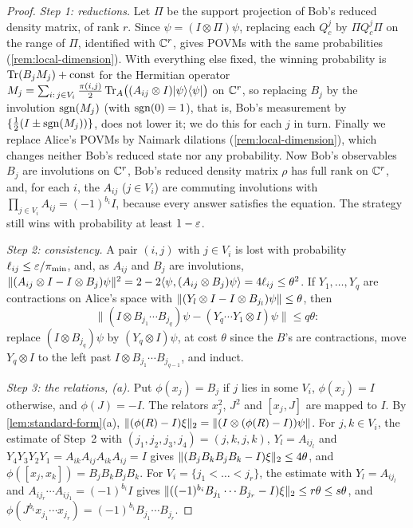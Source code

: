 \begin{proof}
\emph{Step 1: reductions.} Let $\Pi$ be the support projection of Bob's reduced density matrix, of rank $r$. Since $\psi=(I\otimes\Pi)\psi$,
replacing each $Q^j_c$ by $\Pi Q^j_c\Pi$ on the range of $\Pi$, identified with $\mathbb C^r$, gives POVMs with the same probabilities
(\cref{rem:local-dimension}). With everything else fixed, the winning probability is $\operatorname{Tr}(B_jM_j)+\mathrm{const}$ for the Hermitian operator
$M_j=\sum_{i:\,j\in V_i}\frac{\pi(i,j)}2\operatorname{Tr}_A\bigl((A_{ij}\otimes I)|\psi\rangle\langle\psi|\bigr)$ on $\mathbb C^r$, so replacing $B_j$ by the
involution $\operatorname{sgn}(M_j)$ (with $\operatorname{sgn}(0)=1$), that is, Bob's measurement by $\{\frac12(I\pm\operatorname{sgn}(M_j))\}$, does not lower it; we do this for each
$j$ in turn. Finally we replace Alice's POVMs by Naimark dilations (\cref{rem:local-dimension}), which changes neither Bob's reduced state
nor any probability. Now Bob's observables $B_j$ are involutions on $\mathbb C^r$, Bob's reduced density matrix $\rho$ has full rank on $\mathbb C^r$,
and, for each $i$, the $A_{ij}$ ($j\in V_i$) are commuting involutions with $\prod_{j\in V_i}A_{ij}=(-1)^{b_i}I$, because every answer
satisfies the equation. The strategy still wins with probability at least $1-\varepsilon$.

\emph{Step 2: consistency.} A pair $(i,j)$ with $j\in V_i$ is lost with probability $\ell_{ij}\le\varepsilon/\pi_{\min}$, and, as $A_{ij}$ and
$B_j$ are involutions, $\lVert (A_{ij}\otimes I-I\otimes B_j)\psi\rVert^2=2-2\langle\psi,(A_{ij}\otimes B_j)\psi\rangle=4\ell_{ij}\le\theta^2$. If
$Y_1,\dots,Y_q$ are contractions on Alice's space with $\lVert (Y_l\otimes I-I\otimes B_{j_l})\psi\rVert\le\theta$, then
\[
\bigl\|(I\otimes B_{j_1}\cdots B_{j_q})\psi-(Y_q\cdots Y_1\otimes I)\psi\bigr\|\le q\theta :
\]
replace $(I\otimes B_{j_q})\psi$ by $(Y_q\otimes I)\psi$, at cost $\theta$ since the $B$'s are contractions, move $Y_q\otimes I$ to the left
past $I\otimes B_{j_1}\cdots B_{j_{q-1}}$, and induct.

\emph{Step 3: the relations, (a).} Put $\phi(x_j)=B_j$ if $j$ lies in some $V_i$, $\phi(x_j)=I$ otherwise, and $\phi(J)=-I$. The relators
$x_j^2$, $J^2$ and $[x_j,J]$ are mapped to $I$. By \cref{lem:standard-form}(a), $\lVert (\phi(R)-I)\xi\rVert_2=\lVert (I\otimes(\phi(R)-I))\psi\rVert$. For
$j,k\in V_i$, the estimate of Step~2 with $(j_1,j_2,j_3,j_4)=(j,k,j,k)$, $Y_l=A_{ij_l}$ and $Y_4Y_3Y_2Y_1=A_{ik}A_{ij}A_{ik}A_{ij}=I$ gives
$\lVert (B_jB_kB_jB_k-I)\xi\rVert_2\le4\theta$, and $\phi([x_j,x_k])=B_jB_kB_jB_k$. For $V_i=\{j_1<\dots<j_r\}$, the estimate with $Y_l=A_{ij_l}$ and
$A_{ij_r}\cdots A_{ij_1}=(-1)^{b_i}I$ gives $\lVert ((-1)^{b_i}B_{j_1}\cdots B_{j_r}-I)\xi\rVert_2\le r\theta\le s\theta$, and
$\phi(J^{b_i}x_{j_1}\cdots x_{j_r})=(-1)^{b_i}B_{j_1}\cdots B_{j_r}$.


\end{proof}
